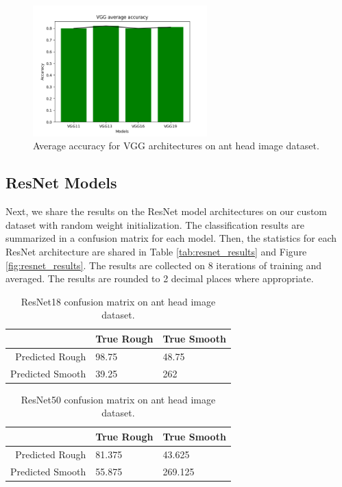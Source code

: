 \documentclass{aci}
\numberwithin{equation}{section}
\begin{document}
\begin{figure}[h]
    \centering
    \includegraphics[width=0.6\textwidth]{thesis_assets/plots/vgg_average.png}
    \caption{Average accuracy for VGG architectures on ant head image dataset.}
    \label{fig:vgg_results}
\end{figure}

\subsection{ResNet Models}

Next, we share the results on the ResNet model architectures on our custom
dataset with random weight initialization. The classification results are
summarized in a confusion matrix for each model. Then, the statistics for each
ResNet architecture are shared in Table \ref{tab:resnet_results} and Figure
\ref{fig:resnet_results}. The results are collected on 8 iterations of training and
averaged. The results are rounded to 2 decimal places where appropriate.

\begin{table}[h]
    \centering
    \caption{ResNet18 confusion matrix on ant head image dataset.}
    \begin{tabular}{r|ll}
                         & True Rough & True Smooth \\
        \hline
        Predicted Rough  & 98.75      & 48.75       \\
        Predicted Smooth & 39.25      & 262         \\
    \end{tabular}
    \label{tab:resnet18_confusion_matrix}
\end{table}

\vspace{0.5in}

\begin{table}[h]
    \centering
    \caption{ResNet50 confusion matrix on ant head image dataset.}
    \begin{tabular}{r|ll}
                         & True Rough & True Smooth \\
        \hline
        Predicted Rough  & 81.375     & 43.625      \\
        Predicted Smooth & 55.875     & 269.125     \\
    \end{tabular}
    \label{tab:resnet50_confusion_matrix}
\end{table}
\end{document}
